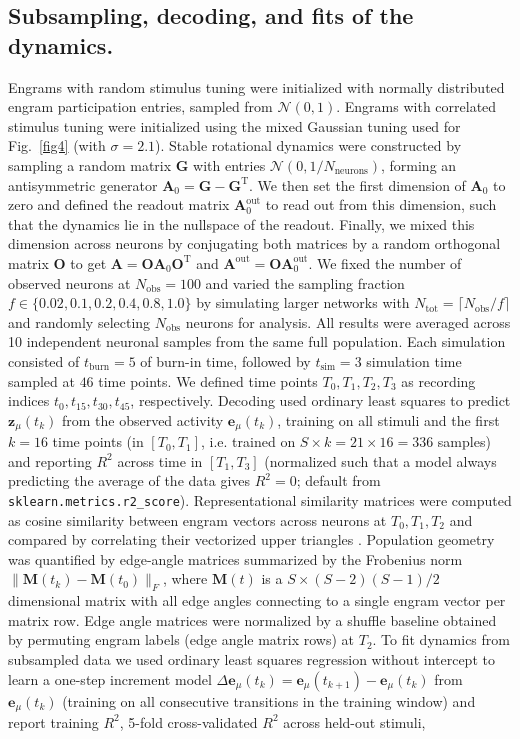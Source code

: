 \subsection{Subsampling, decoding, and fits of the dynamics.}
Engrams with random stimulus tuning were initialized with normally distributed engram participation entries, sampled from $\mathcal{N}(0,1)$. Engrams with correlated stimulus tuning were initialized using the mixed Gaussian tuning used for Fig.~\ref{fig4} (with $\sigma=2.1$). Stable rotational dynamics were constructed by sampling a random matrix $\mathbf{G}$ with entries $\mathcal{N}(0,1/N_{\text{neurons}})$, forming an antisymmetric generator $\mathbf{A}_0=\mathbf{G}-\mathbf{G}^{\text{T}}$. We then set the first dimension of $\mathbf{A}_0$ to zero and defined the readout matrix $\mathbf{A}^{\text{out}}_0$ to read out from this dimension, such that the dynamics lie in the nullspace of the readout. Finally, we mixed this dimension across neurons by conjugating both matrices by a random orthogonal matrix $\mathbf{O}$ to get $\mathbf{A}=\mathbf{O}\mathbf{A}_0\mathbf{O}^{\text{T}}$ and $\mathbf{A}^{\mathrm{out}}=\mathbf{O}\mathbf{A}^{\text{out}}_0$. We fixed the number of observed neurons at $N_{\mathrm{obs}}=100$ and varied the sampling fraction $f\in\{0.02,0.1,0.2,0.4,0.8,1.0\}$ by simulating larger networks with $N_{\mathrm{tot}}=\lceil N_{\mathrm{obs}}/f\rceil$ and randomly selecting $N_{\mathrm{obs}}$ neurons for analysis. All results were averaged across 10 independent neuronal samples from the same full population. Each simulation consisted of $t_{\text{burn}} = 5$ of burn-in time, followed by $t_{\text{sim}} = 3$ simulation time sampled at $46$ time points. We defined time points $T_0,T_1,T_2,T_3$ as recording indices $t_0,t_{15},t_{30},t_{45}$, respectively. Decoding used ordinary least squares to predict $\mathbf{z}_\mu(t_k)$ from the observed activity $\mathbf{e}_\mu(t_k)$, training on all stimuli and the first $k = 16$ time points (in $[T_0,T_1]$, i.e. trained on $S \times k = 21 \times 16 = 336$ samples) and reporting $R^2$ across time in $[T_1,T_3]$ (normalized such that a model always predicting the average of the data gives $R^2=0$; default from \texttt{sklearn.metrics.r2\_score}). Representational similarity matrices were computed as cosine similarity between engram vectors across neurons at $T_0,T_1,T_2$ and compared by correlating their vectorized upper triangles \citep{Deitch2021}. Population geometry was quantified by edge-angle matrices \citep{Schoonover2021,Sylte2025} summarized by the Frobenius norm $\|\mathbf{M}(t_k)-\mathbf{M}(t_0)\|_F$, where $\mathbf{M}(t)$ is a $S \times (S-2)(S-1)/2$ dimensional matrix with all edge angles connecting to a single engram vector per matrix row. Edge angle matrices were normalized by a shuffle baseline obtained by permuting engram labels (edge angle matrix rows) at $T_2$. To fit dynamics from subsampled data we used ordinary least squares regression without intercept to learn a one-step increment model $\Delta\mathbf{e}_\mu(t_k)=\mathbf{e}_\mu(t_{k+1})-\mathbf{e}_\mu(t_k)$ from $\mathbf{e}_\mu(t_k)$ (training on all consecutive transitions in the training window) and report training $R^2$, 5-fold cross-validated $R^2$ across held-out stimuli, 